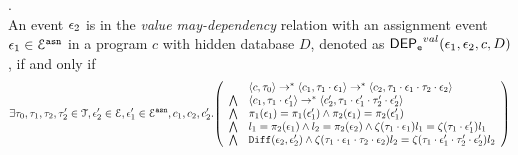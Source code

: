 \begin{defn}
\label{def:event_valdep}.
\\
An event $\mathtt{\epsilon}_2$ is in the \emph{value may-dependency} relation with an assignment
event $\mathtt{\epsilon}_1 \in \mathcal{E}^{\mathtt{{asn}}}$ in a program ${c}$
with hidden database $D$, denoted as 
%
$\mathsf{DEP_{\mathtt{e}}}^{val}(\mathtt{\epsilon}_1, \mathtt{\epsilon}_2, c, D)$, if and only if
%
\[
\exists \vtrace_0,
\vtrace_1, \vtrace_2, \vtrace_2' \in \mathcal{T}, \event_2' \in \eventset, \event_1' \in \eventset^{\asn}, {c}_1, {c}_2,  {c}_2'.
  \left(
  \begin{array}{ll}   
 & \config{{c}, \vtrace_0} \rightarrow^{*} 
\config{{c}_1, \vtrace_1 \cdot \event_1}  \rightarrow^{*} 
  \config{{c}_2,  \vtrace_1 \cdot \event_1 \cdot \vtrace_2 \cdot \event_2 } 
 \\ 
 \bigwedge &
  \config{{c}_1, \vtrace_1 \cdot \event_1'}  \rightarrow^{*} 
  \config{{c}_2',  \vtrace_1 \cdot \event_1' \cdot \vtrace_2' \cdot \event_2' } 
\\
\bigwedge &  \pi_1(\event_1) = \pi_1(\event_1') \land \pi_2(\event_1) = \pi_2(\event_1') 
\\
\bigwedge & l_1 = \pi_2(\event_1) \land l_2 = \pi_2(\event_2)
\land \vcounter(\vtrace_1 \cdot \event_1) l_1 = \vcounter(\vtrace_1 \cdot \event_1')l_1 
\\
\bigwedge & 
\diff(\event_2,\event_2' ) \land 
\vcounter(\vtrace_1 \cdot \event_1 \cdot \vtrace_2\cdot \event_2) l_2
= 
\vcounter(\vtrace_1 \cdot \event_1' \cdot \vtrace_2'\cdot \event_2') l_2\\
\end{array}
\right)
 \]
%
\end{defn}
